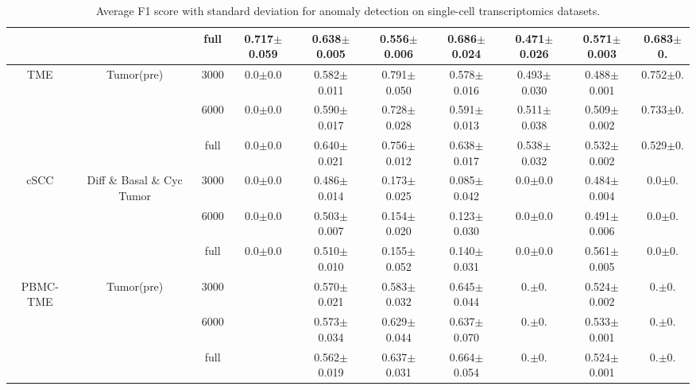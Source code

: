 \documentclass{article}
\begin{document}
\begin{table}[ht]
{\begin{tabular}{cccccccccc}
        & & full & \textbf{0.717$\pm$0.059} & 0.638$\pm$0.005 & 0.556$\pm$0.006 & 0.686$\pm$0.024 & 0.471$\pm$0.026 & 0.571$\pm$0.003 & 0.683$\pm$0. \\
        \hline
        \multirow{3}{*}{\centering TME} & \multirow{3}{*}{\centering Tumor(pre)} & 3000 & 0.0$\pm$0.0 & 0.582$\pm$0.011 & 0.791$\pm$0.050 & 0.578$\pm$0.016 & 0.493$\pm$0.030 & 0.488$\pm$0.001 & 0.752$\pm$0. \\
        & & 6000 & 0.0$\pm$0.0 & 0.590$\pm$0.017 & 0.728$\pm$0.028 & 0.591$\pm$0.013 & 0.511$\pm$0.038 & 0.509$\pm$0.002 & 0.733$\pm$0. \\
        & & full & 0.0$\pm$0.0 & 0.640$\pm$0.021 & 0.756$\pm$0.012 & 0.638$\pm$0.017 & 0.538$\pm$0.032 & 0.532$\pm$0.002 & 0.529$\pm$0. \\
        \hline
        \multirow{3}{*}{\centering cSCC} & \multirow{3}{*}{\centering Diff \& Basal \& Cyc Tumor} & 3000 & 0.0$\pm$0.0 & 0.486$\pm$0.014 & 0.173$\pm$0.025 & 0.085$\pm$0.042 & 0.0$\pm$0.0 & 0.484$\pm$0.004 & 0.0$\pm$0. \\
        & & 6000 & 0.0$\pm$0.0 & 0.503$\pm$0.007 & 0.154$\pm$0.020 & 0.123$\pm$0.030 & 0.0$\pm$0.0 & 0.491$\pm$0.006 & 0.0$\pm$0. \\
        & & full & 0.0$\pm$0.0 & 0.510$\pm$0.010 & 0.155$\pm$0.052 & 0.140$\pm$0.031 & 0.0$\pm$0.0 & 0.561$\pm$0.005 & 0.0$\pm$0. \\
        \hline
        \multirow{3}{*}{\centering PBMC-TME} & \multirow{3}{*}{\centering Tumor(pre)} & 3000 & & 0.570$\pm$0.021 & 0.583$\pm$0.032 & 0.645$\pm$0.044 & 0.$\pm$0. & 0.524$\pm$0.002 & 0.$\pm$0.  \\
        & & 6000 & & 0.573$\pm$0.034 & 0.629$\pm$0.044 & 0.637$\pm$0.070 & 0.$\pm$0. & 0.533$\pm$0.001 & 0.$\pm$0. \\
        & & full & & 0.562$\pm$0.019 & 0.637$\pm$0.031 & 0.664$\pm$0.054 & 0.$\pm$0. & 0.524$\pm$0.001 & 0.$\pm$0. \\
        \hline
    \end{tabular}
    }
    \caption{Average F1 score with standard deviation for anomaly detection on single-cell transcriptomics datasets.}
    \label{tab:tab2}
\end{table}
\end{document}
